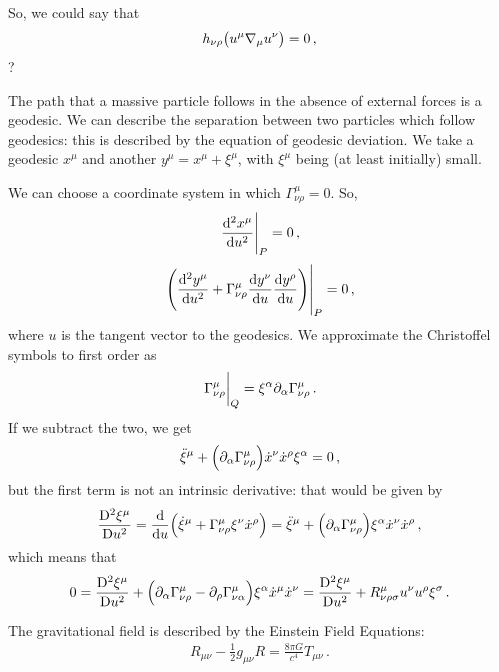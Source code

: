 \documentclass[main.tex]{subfiles}
\begin{document}
So, we could say that 
%
\begin{align}
h_{\nu \rho } \qty(u^{\mu } \nabla_{\mu } u^{\nu }) =0
\,,
\end{align}
%
?


The path that a massive particle follows in the absence of external forces is a geodesic. 
We can describe the separation between two particles which follow geodesics: this is described by the equation of geodesic deviation. 
We take a geodesic \(x^{\mu }\) and another \(y^{\mu } = x^{\mu }+ \xi^{\mu }\), with \(\xi^{\mu }\) being (at least initially) small. 

We can choose a coordinate system in which \(\Gamma^{\mu }_{\nu \rho } =0\). So, 
%
\begin{align}
\eval{\dv[2]{x^{\mu }}{u}}_{P} = 0
\,,
\end{align} 
%
\begin{align}
\eval{\qty(\dv[2]{y^{\mu }}{u} + \Gamma^{\mu }_{\nu \rho } \dv{y^{\nu }}{u} \dv{y^{\rho }}{u})}_{P} = 0
\,,
\end{align}
%
where \(u\) is the tangent vector to the geodesics. We approximate the Christoffel symbols to first order as 
%
\begin{align}
\eval{\Gamma^{\mu }_{\nu \rho }}_{Q} = \xi^{\alpha } \partial_{\alpha } \Gamma^{\mu }_{\nu \rho }
\,.
\end{align}
%
If we subtract the two, we get 
%
\begin{align}
\ddot{\xi}^{\mu } + \qty(\partial_{\alpha } \Gamma^{\mu }_{\nu \rho }) \dot{x}^{\nu } \dot{x}^{\rho } \xi^{\alpha } = 0
\,,
\end{align}
%
but the first term is not an intrinsic derivative: that would be given by 
%
\begin{align}
\frac{\mathrm{D}^2 \xi^{\mu }}{\mathrm{D} u^2} 
= \dv{}{u} \qty(\dot{\xi}^{\mu } + \Gamma^{\mu }_{\nu \rho } \xi^{\nu } \dot{x}^{\rho }) = \ddot{\xi}^{\mu }+ \qty(\partial_{\alpha } \Gamma^{\mu }_{\nu \rho }) \xi^{\alpha } \dot{x}^{\nu } \dot{x}^{\rho }
\,,
\end{align}
%
which means that 
%
\begin{align}
0= \frac{\mathrm{D}^2 \xi^{\mu }}{\mathrm{D} u^2} 
+ \qty(\partial_{\alpha } \Gamma^{\mu }_{\nu \rho } - \partial_{\rho } \Gamma^{\mu }_{\nu \alpha }) \xi^{\alpha } \dot{x}^{\mu } \dot{x}^{\nu }
= \frac{\mathrm{D}^2 \xi^{\mu }}{\mathrm{D} u^2} 
+ R^{\mu }_{\nu \rho \sigma } u^{\nu } u^{\rho } \xi ^{\sigma }
\,.
\end{align}

The gravitational field is described by the Einstein Field Equations: 
%
\begin{align}
R_{\mu \nu } - \frac{1}{2} g_{\mu \nu } R = \frac{8 \pi G}{c^{4}} T_{\mu \nu } 
\,.
\end{align}
\end{document}
